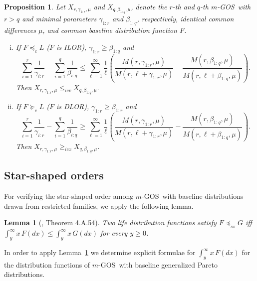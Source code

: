 \documentclass [11pt]{article}
\newtheorem{lemma}{Lemma}
\newtheorem{proposition}{Proposition}
\newcommand{\gos}{GOS}
\begin{document}
\begin{proposition}
\label{prop:log-odds1}
Let $X_{r,\gamma_{1:r}, \mu}$ and  $X_{q,\beta_{1:q},\mu}$, denote the $r$-th and $q$-th $m$-\gos\ with $r>q$ and minimal parameters  $\gamma_{1:r}$ and $\beta_{1:q}$, respectively, identical common differences $\mu$, and common baseline distribution function $F$.
    \begin{enumerate}[(i)]
    \item
    If $F \preceq_c L$ ($F$ is ILOR),
    $\gamma_{1:r}\geq\beta_{1:q}$ and
    \begin{equation*}
    \label{eq:icx-ior-rq}
    \sum_{i=1}^r \frac{1}{\gamma_{i:r}} -\sum_{i=1}^q\frac{1}{\beta_{i:q}}
    \leq
    \sum_{\ell=1}^\infty\frac1\ell\left(
    \frac{M(r,\gamma_{1:r},\mu)}{M(r,\ell+\gamma_{1:r},\mu)}
    -
    \frac{M(r,\beta_{1:q},\mu)}{M(r,\ell+\beta_{1:q},\mu)}\right).
    \end{equation*}
    Then $X_{r,\gamma_{1:r}, \mu} \leq_{icv} X_{q,\beta_{1:q},\mu}$.
    \item
    If $F \succeq_c L$ ($F$ is DLOR),
    $\gamma_{1:r}\geq\beta_{1:r}$ and
    \begin{equation*}
    \label{eq:icv-dor-rq}
    \sum_{i=1}^r \frac{1}{\gamma_{i:r}}
    -\sum_{i=1}^q\frac{1}{\beta_{i:q}}
    \geq
    \sum_{\ell=1}^\infty\frac1\ell\left(
    \frac{M(r,\gamma_{1:r},\mu)}{M(r,\ell+\gamma_{1:r},\mu)}
    -
    \frac{M(r,\beta_{1:q},\mu)}{M(r,\ell+\beta_{1:q},\mu)}\right).
    \end{equation*}
    Then $X_{r,\gamma_{1:r}, \mu} \geq_{icx} X_{q,\beta_{1:q},\mu}$.
    \end{enumerate}
\end{proposition}

\subsection{Star-shaped orders}
For verifying the star-shaped order among $m$-\gos\ with baseline distributions drawn from restricted families, we apply the following lemma.
\begin{lemma}[\cite{shaked2007}, Theorem 4.A.54]
\label{l2}
Two life distribution functions
satisfy $F \preceq_{ss} G$  iff $\int_y^\infty x \,F(dx) \leq
\int_y^\infty x \,G(dx)$ for every $y \geq 0$.
\end{lemma}
In order to apply Lemma~\ref{l2} we determine explicit formulae for $\int_y^\infty x \,F(dx)$ for the distribution functions of $m$-\gos\ with baseline generalized Pareto distributions.
\end{document}
